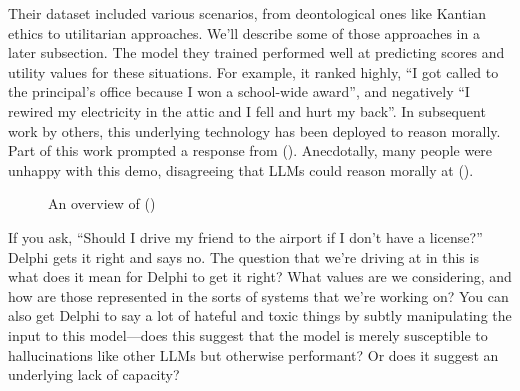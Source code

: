 \documentclass[
  letterpaper,
  numbers=noenddot,
  DIV=11]{scrreprt}
\theoremstyle{definition}
\theoremstyle{plain}
\theoremstyle{plain}
\theoremstyle{remark}
\begin{document}
Their dataset included various scenarios, from deontological ones like
Kantian ethics to utilitarian approaches. We'll describe some of those
approaches in a later subsection. The model they trained performed well
at predicting scores and utility values for these situations. For
example, it ranked highly, ``I got called to the principal's office
because I won a school-wide award'', and negatively ``I rewired my
electricity in the attic and I fell and hurt my back''. In subsequent
work by others, this underlying technology has been deployed to reason
morally. Part of this work prompted a response from
(). Anecdotally,
many people were unhappy with this demo, disagreeing that LLMs could
reason morally at ().

\begin{figure}


\caption{\label{fig-delphi}An overview of
()}

\end{figure}%

If you ask, ``Should I drive my friend to the airport if I don't have a
license?'' Delphi gets it right and says no. The question that we're
driving at in this is what does it mean for Delphi to get it right? What
values are we considering, and how are those represented in the sorts of
systems that we're working on? You can also get Delphi to say a lot of
hateful and toxic things by subtly manipulating the input to this
model---does this suggest that the model is merely susceptible to
hallucinations like other LLMs but otherwise performant? Or does it
suggest an underlying lack of capacity?
\end{document}
